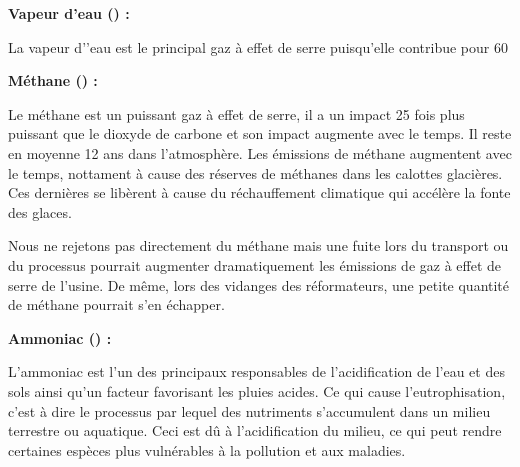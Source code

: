 \documentclass[a4paper, oneside, 12pt]{article}
\begin{document}
\textbf{Vapeur d'eau () : }

La vapeur d’’eau est le principal gaz à effet de serre puisqu’elle contribue pour 60%

\textbf{Méthane () :}

Le méthane est un puissant gaz à effet de serre, il a un impact 25 fois plus puissant que le dioxyde de carbone et son impact augmente avec le temps. Il reste en moyenne 12 ans dans l’atmosphère. Les émissions de méthane augmentent avec le temps, nottament à cause des réserves de méthanes dans les calottes glacières. Ces dernières se libèrent à cause du réchauffement climatique qui accélère la fonte des glaces. 

Nous ne rejetons pas directement du méthane mais une fuite lors du transport ou du processus pourrait augmenter dramatiquement les émissions de gaz à effet de serre de l’usine.  De même, lors des vidanges des réformateurs, une petite quantité de méthane pourrait s’en échapper.  \newline


\textbf{Ammoniac () : }

L’ammoniac est l’un des principaux responsables de l’acidification de l’eau et des sols ainsi qu’un facteur favorisant les pluies acides. Ce qui cause l’eutrophisation, c’est à dire le processus par lequel des nutriments s’accumulent dans un milieu terrestre ou aquatique. Ceci est dû à l’acidification du milieu, ce qui peut rendre certaines espèces plus vulnérables à la pollution et aux maladies. 
	
\end{document}
